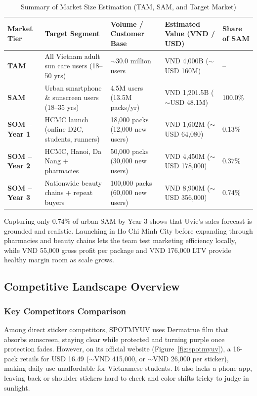 \begin{table}[ht]
\centering\small
\caption{Summary of Market Size Estimation (TAM, SAM, and Target Market)}\label{tab:market-size}
\begin{tabular}{@{}L{1.5cm}L{3.8cm}L{3.0cm}L{3.4cm}L{1.6cm}@{}}
  \toprule
  \textbf{Market Tier} & \textbf{Target Segment} & \textbf{Volume / Customer Base} & \textbf{Estimated Value (VND / USD)} & \textbf{Share of SAM}\\
  \midrule
  \textbf{TAM} & All Vietnam adult sun care users (18--50 yrs) & $\sim$30.0 million users & VND 4,000B ($\sim$USD 160M) & --\\
  \addlinespace
  \textbf{SAM} & Urban smartphone \& sunscreen users (18--35 yrs) & 4.5M users (13.5M packs/yr) & VND 1,201.5B ($\sim$USD 48.1M) & 100.0\%\\
  \addlinespace
  \textbf{SOM -- Year 1} & HCMC launch (online D2C, students, runners) & 18,000 packs (12,000 new users) & VND 1,602M ($\sim$USD 64,080) & 0.13\%\\
  \addlinespace
  \textbf{SOM -- Year 2} & HCMC, Hanoi, Da Nang + pharmacies & 50,000 packs (30,000 new users) & VND 4,450M ($\sim$USD 178,000) & 0.37\%\\
  \addlinespace
  \textbf{SOM -- Year 3} & Nationwide beauty chains + repeat buyers & 100,000 packs (60,000 new users) & VND 8,900M ($\sim$USD 356,000) & 0.74\%\\
  \bottomrule
\end{tabular}
\end{table}

Capturing only 0.74\% of urban SAM by Year 3 shows that Uvie's sales forecast is
grounded and realistic. Launching in Ho Chi Minh City before expanding through
pharmacies and beauty chains lets the team test marketing efficiency locally,
while VND 55,000 gross profit per package and VND 176,000 LTV provide healthy
margin room as scale grows.

\subsection{Competitive Landscape Overview}\label{sec:competitors}

\subsubsection{Key Competitors Comparison}
Among direct sticker competitors, SPOTMYUV uses Dermatrue film that absorbs
sunscreen, staying clear while protected and turning purple once protection fades.
However, on its official website (Figure~\ref{fig:spotmyuv}), a 16-pack retails for
USD 16.49 ($\sim$VND 415,000, or $\sim$VND 26,000 per sticker), making daily use
unaffordable for Vietnamese students. It also lacks a phone app, leaving back or
shoulder stickers hard to check and color shifts tricky to judge in sunlight.

